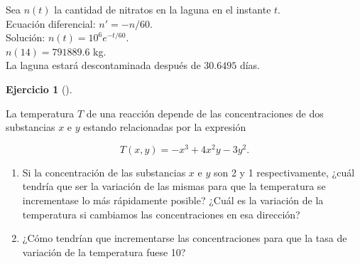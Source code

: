 \documentclass[
  a4paper,
]{scrreport}
\providecommand{\tightlist}{%
  \setlength{\itemsep}{0pt}\setlength{\parskip}{0pt}}\usepackage{longtable,booktabs,array}
\theoremstyle{definition}
\newtheorem{exercise}{Ejercicio}[chapter]
\theoremstyle{remark}
\begin{document}
\begin{tcolorbox}[enhanced jigsaw, opacitybacktitle=0.6, titlerule=0mm, bottomtitle=1mm, toptitle=1mm, breakable, bottomrule=.15mm, left=2mm, opacityback=0, toprule=.15mm, leftrule=.75mm, colframe=quarto-callout-tip-color-frame, coltitle=black, rightrule=.15mm, colback=white, title=\textcolor{quarto-callout-tip-color}{\faLightbulb}\hspace{0.5em}{Solución}, arc=.35mm, colbacktitle=quarto-callout-tip-color!10!white]

Sea \(n(t)\) la cantidad de nitratos en la laguna en el instante
\(t\).\\
Ecuación diferencial: \(n'=-n/60\).\\
Solución: \(n(t)=10^6 e^{-t/60}\).\\
\(n(14)=791889.6\) kg.\\
La laguna estará descontaminada después de \(30.6495\) días.

\end{tcolorbox}

\begin{exercise}[]\protect\hypertarget{exr-2}{}\label{exr-2}

La temperatura \(T\) de una reacción depende de las concentraciones de
dos substancias \(x\) e \(y\) estando relacionadas por la expresión

\[
T(x,y)=-x^3+4x^2y-3y^2.
\]

\begin{enumerate}
\def\labelenumi{\arabic{enumi}.}
\tightlist
\item
  Si la concentración de las substancias \(x\) e \(y\) son 2 y 1
  respectivamente, ¿cuál tendría que ser la variación de las mismas para
  que la temperatura se incrementase lo más rápidamente posible? ¿Cuál
  es la variación de la temperatura si cambiamos las concentraciones en
  esa dirección?
\item
  ¿Cómo tendrían que incrementarse las concentraciones para que la tasa
  de variación de la temperatura fuese 10?
\end{enumerate}

\end{exercise}
\end{document}

